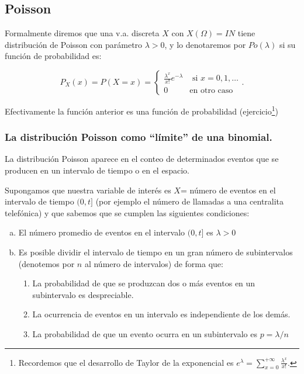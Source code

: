 \documentclass[12pt]{report}
\def\N{I\!\!N}
\begin{document}
     \subsection{Poisson}
     
   
     
     Formalmente diremos que una v.a. discreta $X$ con $X(\Omega)=\N$ tiene
     distribución de Poisson con parámetro $\lambda>0$, y lo denotaremos
     por $Po(\lambda)$ si su función de probabilidad es:

    $$P_{X}(x)=P(X=x)=
    \left\{\begin{array}{ll}
    \frac{\lambda^x}{x!} e^{-\lambda}& \mbox{ si } x=0,1,\ldots\\
     0 & \mbox{en otro caso}\end{array}\right..$$

Efectivamente la función anterior es una función de probabilidad (ejercicio\footnote{
Recordemos que el desarrollo de Taylor de la exponencial es $e^{\lambda}=\sum_{x=0}^{+\infty} \frac{\lambda^x}{x!}$.
})

    \subsubsection{La distribución Poisson como ``límite'' de una binomial.}
    


    La distribución Poisson aparece en el conteo de determinados  eventos que se
    producen en un intervalo de tiempo o en el espacio.

       Supongamos que nuestra variable de interés es  $X$= número de
    eventos en el intervalo de tiempo $(0,t]$ (por ejemplo el número de
    llamadas a una centralita telefónica) y que sabemos que se
    cumplen las siguientes condiciones:


    \begin{enumerate}[a)]
        \item El número promedio de eventos en el intervalo $(0,t]$ es
        $\lambda>0$
        \item Es posible dividir el intervalo de tiempo en un
        gran número de subintervalos (denotemos por $n$ al número de intervalos) de forma que:
        \begin{enumerate}[1)]
        \item La probabilidad de que se produzcan dos o más eventos en un
        subintervalo es des\-pre\-cia\-ble.
        \item La ocurrencia de eventos en un intervalo  es
        independiente de los demás.
        \item La probabilidad de que un evento ocurra en un subintervalo
        es $p=\lambda/n$
        \end{enumerate}
        \end{enumerate}
\end{document}
